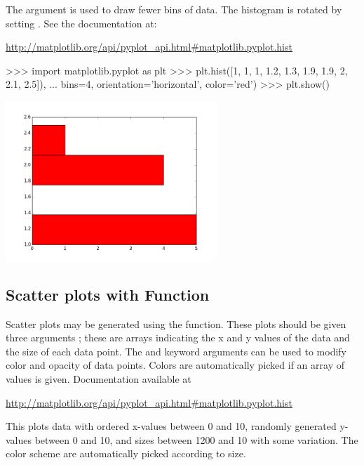 \documentclass[11pt]{cselabheader}
\begin{document}
The  argument is used to draw fewer bins of
data. The histogram is rotated by setting
. See the documentation at:

\begin{center}
\url{http://matplotlib.org/api/pyplot_api.html#matplotlib.pyplot.hist}
\end{center}

\begin{pyconcode}
>>> import matplotlib.pyplot as plt
>>> plt.hist([1, 1, 1, 1.2, 1.3, 1.9, 1.9, 2, 2.1, 2.5]),
...          bins=4, orientation='horizontal', color='red')
>>> plt.show()
\end{pyconcode}

\begin{center}
\includegraphics[width=0.6\textwidth]{img/matplotlib_hist2.png}
\end{center}

\subsection{Scatter plots with  Function}

Scatter plots may be generated using the  function.
These plots should be given three arguments ; these are
arrays indicating the x and y values of the data and the size of each data point.
The  and  keyword arguments can be used to
modify color and opacity of data points. Colors are automatically picked if an
array of values is given. Documentation available at

\begin{center}
\url{http://matplotlib.org/api/pyplot_api.html#matplotlib.pyplot.hist}
\end{center}

This plots data with ordered x-values between 0 and 10, randomly generated
y-values between 0 and 10, and sizes between 1200 and 10 with some variation.
The color scheme are automatically picked according to size.
\end{document}
